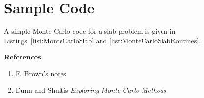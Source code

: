 \section*{Sample Code}

A simple Monte Carlo code for a slab problem is given in
Listings~\ref{list:MonteCarloSlab} and \ref{list:MonteCarloSlabRoutines}.

\lstset{language=Fortran,caption=Main program for a Monte Carlo slab problem, label=list:MonteCarloSlab}


\lstset{language=Fortran,caption=Subroutines for a Monte Carlo slab problem, label=list:MonteCarloSlabRoutines}


\textbf{References}
 \begin{enumerate}
  \item F. Brown's notes
  \item Dunn and Shultis \emph{Exploring Monte Carlo Methods}
 \end{enumerate}
